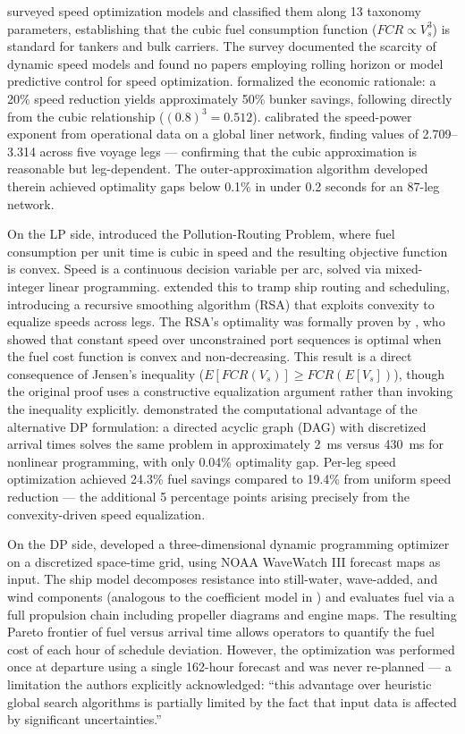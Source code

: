 \documentclass[review]{elsarticle}
\begin{document}
\cite{Psaraftis2013} surveyed speed optimization models and classified them along 13 taxonomy parameters, establishing that the cubic fuel consumption function ($FCR \propto V_s^3$) is standard for tankers and bulk carriers. The survey documented the scarcity of dynamic speed models and found no papers employing rolling horizon or model predictive control for speed optimization. \cite{Ronen2011} formalized the economic rationale: a 20\% speed reduction yields approximately 50\% bunker savings, following directly from the cubic relationship ($(0.8)^3 = 0.512$). \cite{Wang2012} calibrated the speed-power exponent from operational data on a global liner network, finding values of 2.709--3.314 across five voyage legs --- confirming that the cubic approximation is reasonable but leg-dependent. The outer-approximation algorithm developed therein achieved optimality gaps below 0.1\% in under 0.2 seconds for an 87-leg network.

On the LP side, \cite{Bektas2011} introduced the Pollution-Routing Problem, where fuel consumption per unit time is cubic in speed and the resulting objective function is convex. Speed is a continuous decision variable per arc, solved via mixed-integer linear programming. \cite{Norstad2011} extended this to tramp ship routing and scheduling, introducing a recursive smoothing algorithm (RSA) that exploits convexity to equalize speeds across legs. The RSA's optimality was formally proven by \cite{Hvattum2013}, who showed that constant speed over unconstrained port sequences is optimal when the fuel cost function is convex and non-decreasing. This result is a direct consequence of Jensen's inequality ($E[FCR(V_s)] \geq FCR(E[V_s])$), though the original proof uses a constructive equalization argument rather than invoking the inequality explicitly. \cite{Fagerholt2010} demonstrated the computational advantage of the alternative DP formulation: a directed acyclic graph (DAG) with discretized arrival times solves the same problem in approximately 2~ms versus 430~ms for nonlinear programming, with only 0.04\% optimality gap. Per-leg speed optimization achieved 24.3\% fuel savings compared to 19.4\% from uniform speed reduction --- the additional 5 percentage points arising precisely from the convexity-driven speed equalization.

On the DP side, \cite{Zaccone2018} developed a three-dimensional dynamic programming optimizer on a discretized space-time grid, using NOAA WaveWatch III forecast maps as input. The ship model decomposes resistance into still-water, wave-added, and wind components (analogous to the coefficient model in \cite{Yang2020}) and evaluates fuel via a full propulsion chain including propeller diagrams and engine maps. The resulting Pareto frontier of fuel versus arrival time allows operators to quantify the fuel cost of each hour of schedule deviation. However, the optimization was performed once at departure using a single 162-hour forecast and was never re-planned --- a limitation the authors explicitly acknowledged: ``this advantage over heuristic global search algorithms is partially limited by the fact that input data is affected by significant uncertainties.''
\end{document}
